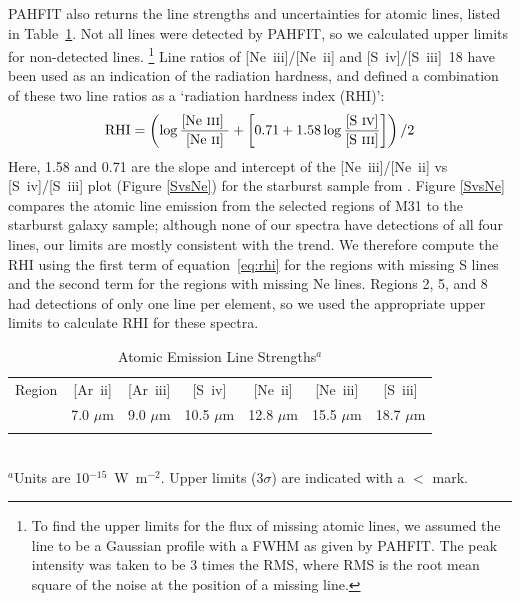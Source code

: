 PAHFIT also returns the line strengths and uncertainties for atomic lines, listed in Table~\ref{Atomic}.
Not all lines were detected by PAHFIT, so we calculated upper limits for non-detected lines.%
\footnote{To find  the upper limits for the flux of missing atomic lines, we assumed the line to be a 
Gaussian profile with a FWHM as given by PAHFIT. The peak intensity was taken to be 3 times the RMS, where RMS is the root mean square of 
the noise at the position of a missing line.}
Line ratios of [Ne~{\sc iii}]/[Ne~{\sc ii}] and [S~{\sc iv}]/[S~{\sc iii}]~18 have been used as an indication of the radiation hardness, and
\citet{Engelbracht_2008} defined a combination of these two line ratios as a `radiation hardness index (RHI)':
\begin{equation}
{\rm RHI} = \left( \log\frac{\textrm{[Ne~{\sc iii}] }}{\textrm{[Ne~{\sc ii}]}} + \left[0.71 + 1.58\log\frac{\textrm{{[S~{\sc iv}]}}}{\textrm{{[S~{\sc iii}]}}}\right]\right) /2
\end{equation}
\label{eq:rhi}
Here, 1.58 and 0.71 are the slope and intercept of the [Ne~{\sc iii}]/[Ne~{\sc ii}]  vs [S~{\sc iv}]/[S~{\sc iii}] plot (Figure \ref{SvsNe}) for the starburst sample from 
\citet{Engelbracht_2008}. 
Figure \ref{SvsNe}  compares the atomic line emission from the selected regions of M31 to the starburst galaxy sample;
although none of our spectra have detections of all four lines, our limits are mostly consistent with the trend.
We therefore compute the RHI using the first term of equation~\ref{eq:rhi} for the regions with missing S lines
and the second term for the regions with missing Ne lines.
Regions 2, 5, and 8 had detections of only one line per element, so we used the appropriate upper limits 
to calculate RHI for these spectra.


\begin{table}
 \centering
 \begin{minipage}{100mm}
\caption{Atomic Emission Line Strengths$^a$}
  \begin{tabular}{l c c  c  c  c  c  }
  \hline
  {Region  }&{[Ar~{\sc ii}] }&{[Ar~{\sc iii}]  }&{[S~{\sc iv}]}&{[Ne~{\sc ii}]   }&{[Ne~{\sc iii}]   }&{[S~{\sc iii}]  }\\
{}&{\tiny{7.0 $\mu$m} }&{\tiny{9.0 $\mu$m }}&{\tiny{10.5 $\mu$m}}&{\tiny{12.8 $\mu$m  }}&{\tiny{15.5 $\mu$m } }&{\tiny{18.7 $\mu$m }} \\
 \hline 
  
\hline
 \label{Atomic}
\end{tabular}\\
{ $^a$Units are 10$^{-15}$~W~m$^{-2}$. Upper limits ($3\sigma$) are indicated with a $<$ mark.  }
\end{minipage}
\end{table}

